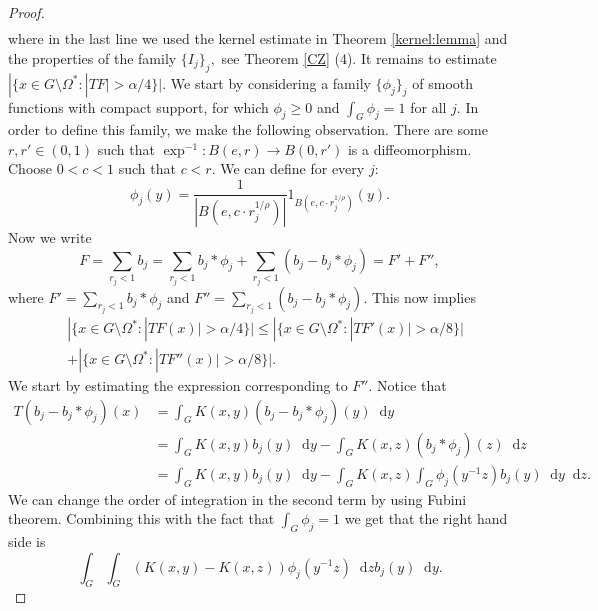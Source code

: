 \documentclass[12pt, reqno]{amsart}
\theoremstyle{definition}
\theoremstyle{remark}
\numberwithin{equation}{section}
\newcommand*\diff{\mathop{}\!\mathrm{d}}
\begin{document}
\begin{proof}
\begin{equation*}
\begin{aligned}
    \end{aligned}
    \end{equation*}
    where in the last line we used the kernel estimate in Theorem \ref{kernel:lemma} and the properties of the family $\{I_j\}_j,$ see Theorem \ref{CZ} (4). It remains to estimate $|\{x\in G\setminus\Omega^*:|TF|>\alpha/4\}|$. We start by considering a family $\{\phi_j\}_j$ of smooth functions with compact support, for which $\phi_j\geq 0$ and $\int_{G}\phi_j=1$ for all $j$. In order to define this family, we make the following observation. There are some $r,r'\in(0,1)$ such that $\exp^{-1}\colon B(e,r)\to B(0,r')$ is a diffeomorphism. Choose $0<c<1$ such that $c<r$. We can define for every $j$:
    \begin{equation*}
        \phi_j(y)=\frac{1}{|B(e,c\cdot r_j^{1/\rho})|}1_{B(e,c\cdot r_j^{1/\rho})}(y).
    \end{equation*}
    Now we write
    \begin{equation*}
         F=\sum_{r_j<1}b_j=\sum_{r_j<1}b_j*\phi_j+\sum_{r_j<1}(b_j-b_j*\phi_j)=F'+F'',
    \end{equation*}
    where $F'=\sum_{r_j<1}b_j*\phi_j$ and $F''=\sum_{r_j<1}(b_j-b_j*\phi_j)$. This now implies
    \begin{eqnarray*}
     &|\{x\in G\setminus\Omega^*:|TF(x)|>\alpha/4\}|\leq|\{x\in G\setminus\Omega^*:|TF'(x)|>\alpha/8\}|\\
     &+|\{x\in G\setminus\Omega^*:|TF''(x)|>\alpha/8\}|.
\end{eqnarray*}   
    We start by estimating the expression corresponding to $F''$. Notice that
    \begin{equation*}
    \begin{aligned}
        T(b_j-b_j*\phi_j)(x)&=\int_{G}K(x,y)(b_j-b_j*\phi_j)(y)\diff{y}\\
        &=\int_{G}K(x,y)b_j(y)\diff{y}-\int_{G}K(x,z)(b_j*\phi_j)(z)\diff{z}\\
        &=\int_{G}K(x,y)b_j(y)\diff{y}-\int_{G}K(x,z)\int_{G}\phi_j(y^{-1}z)b_j(y)\diff{y}\diff{z}.
    \end{aligned}
    \end{equation*}
    We can change the order of integration in the second term by using Fubini theorem. Combining this with the fact that $\int_{G}\phi_j=1$ we get that the right hand side is
    \begin{equation*}
        \int_{G}\int_{G}(K(x,y)-K(x,z))\phi_j(y^{-1}z)\diff{z}b_j(y)\diff{y}.
    \end{equation*}

\end{proof}
\end{document}
